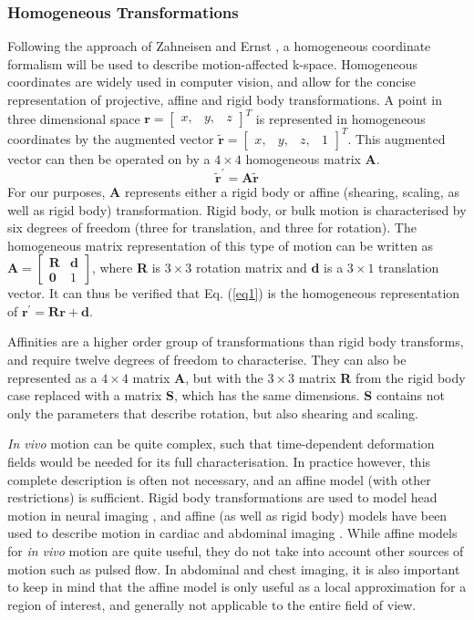 \documentclass[class=article, crop=false]{standalone}
\begin{document}
\subsubsection*{Homogeneous Transformations}
Following the approach of Zahneisen and Ernst \parencite*{Zahneisen2016}, a homogeneous coordinate formalism will be used to describe motion-affected k-space. Homogeneous coordinates are widely used in computer vision, and allow for the concise representation of projective, affine and rigid body transformations. A point in three dimensional space $\textbf{r} = \begin{bmatrix} x,&y,&z\end{bmatrix}^{T}$ is represented in homogeneous coordinates by the augmented vector $\tilde{\textbf{r}} = \begin{bmatrix}x,&y,&z,&1\end{bmatrix}^{T}$. This augmented vector can then be operated on by a $4\times4$ homogeneous matrix \textbf{A}.
\begin{equation}
	\label{eq1}
	\tilde{\textbf{r}}^{'} = \textbf{A}\tilde{\textbf{r}}
\end{equation}
For our purposes, \textbf{A} represents either a rigid body or affine (shearing, scaling, as well as rigid body) transformation. Rigid body, or bulk motion is characterised by six degrees of freedom (three for translation, and three for rotation). The homogeneous matrix representation of this type of motion can be written as $\textbf{A} = \begin{bmatrix} \textbf{R} & \textbf{d} \\ \textbf{0} & 1 \end{bmatrix}$, where \textbf{R} is $3\times3$ rotation matrix and \textbf{d} is a $3\times1$ translation vector. It can thus be verified that Eq. (\ref{eq1}) is the homogeneous representation of $\textbf{r}^{'} = \textbf{R} \textbf{r} + \textbf{d}$.
\par
Affinities are a higher order group of transformations than rigid body transforms, and require twelve degrees of freedom to characterise. They can also be represented as a $4\times4$ matrix \textbf{A}, but with the $3\times3$ matrix \textbf{R} from the rigid body case replaced with a matrix \textbf{S}, which has the same dimensions. \textbf{S} contains not only the parameters that describe rotation, but also shearing and scaling.
\par
\textit{In vivo} motion can be quite complex, such that time-dependent deformation fields would be needed for its full characterisation. In practice however, this complete description is often not necessary, and an affine model (with other restrictions) is sufficient. Rigid body transformations are used to model head motion in neural imaging \parencite{Godenschweger2016}, and affine (as well as rigid body) models have been used to describe motion in cardiac and abdominal imaging \parencite{Nehrke2005,Manke2002,Pipe1999}. While affine models for \textit{in vivo} motion are quite useful, they do not take into account other sources of motion such as pulsed flow. In abdominal and chest imaging, it is also important to keep in mind that the affine model is only useful as a local approximation for a region of interest, and generally not applicable to the entire field of view.
\end{document}
